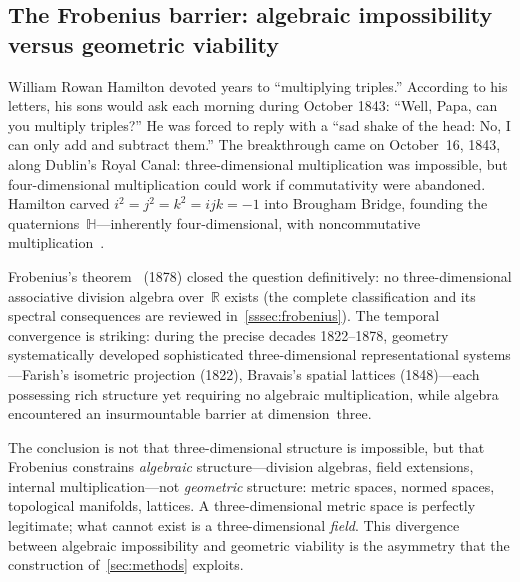 
\subsection{The Frobenius barrier: algebraic impossibility versus
geometric viability}\label{ssec:frobenius}

William Rowan Hamilton devoted years to ``multiplying triples.''
According to his letters, his sons would ask each morning during
October 1843: ``Well, Papa, can you multiply triples?''  He was forced
to reply with a ``sad shake of the head: No, I can only add and subtract
them.''  The breakthrough came on October~16, 1843, along Dublin's Royal
Canal: three-dimensional multiplication was impossible, but
four-dimensional multiplication could work if commutativity were
abandoned.  Hamilton carved $i^2 = j^2 = k^2 = ijk = -1$ into
Brougham Bridge, founding the quaternions~$\mathbb{H}$---inherently
four-dimensional, with noncommutative multiplication~\cite{hamilton}.

Frobenius's theorem~\cite{frobenius1878} (1878) closed the question definitively: no
three-dimensional associative division algebra over~$\mathbb{R}$
exists (the complete classification and its spectral consequences
are reviewed in~\cref{sssec:frobenius}).  The temporal convergence is striking:
during the precise decades 1822--1878, geometry systematically
developed sophisticated three-dimensional representational
systems---Farish's isometric projection (1822), Bravais's spatial
lattices (1848)---each possessing rich structure yet requiring no
algebraic multiplication, while algebra encountered an
insurmountable barrier at dimension~three.

The conclusion is not that three-dimensional structure is impossible,
but that Frobenius constrains \emph{algebraic} structure---division
algebras, field extensions, internal multiplication---not
\emph{geometric} structure: metric spaces, normed spaces, topological
manifolds, lattices.  A three-dimensional metric
space is perfectly legitimate; what cannot exist is a
three-dimensional \emph{field}.  This divergence between algebraic
impossibility and geometric viability is the asymmetry that the
construction of~\cref{sec:methods} exploits.

